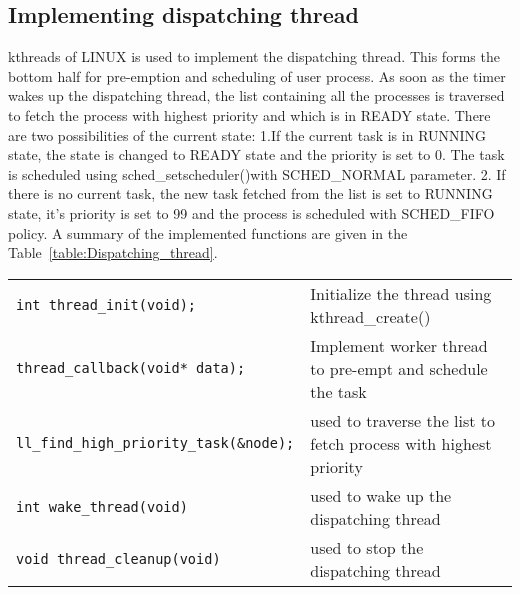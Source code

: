 \subsection{Implementing dispatching thread}\label{subsec:dispatch}

kthreads of LINUX is used to implement the dispatching thread. This forms the bottom half for pre-emption and scheduling of user process. As soon as the timer wakes up the dispatching thread, the list containing all the processes is traversed to fetch the process with highest priority and which is in READY state. There are two possibilities of the current state:
1.If the current task is in RUNNING state, the state is changed to READY state and the priority is set to 0. The task is scheduled using sched\_setscheduler()with SCHED\_NORMAL parameter.
2. If there is no current task, the new task fetched from the list is set to RUNNING state, it's priority is set to 99 and the process is scheduled with SCHED\_FIFO policy.
A summary of the implemented functions are given in the Table~\ref{table:Dispatching_thread}.

\begin{table*}[h]
  \centering
  \rcow
  \caption{List of functions to initialize and cleanup Dispatching thread\label{table:Dispatching_thread}}
  \begin{tabular}{|p{7.5cm}|p{8cm}|}
    {\tt int thread\_init(void);}  &  Initialize the thread using kthread\_create() \\
    {\tt thread\_callback(void* data);} &     Implement worker thread to pre-empt and schedule the task  \\
    {\tt ll\_find\_high\_priority\_task(\&node);} & used to traverse the list to fetch process with highest priority\\
    {\tt int wake\_thread(void)}&  used to wake up the dispatching thread \\
    {\tt void thread\_cleanup(void)} & used to stop the dispatching thread  \\
  \end{tabular}
\end{table*}


